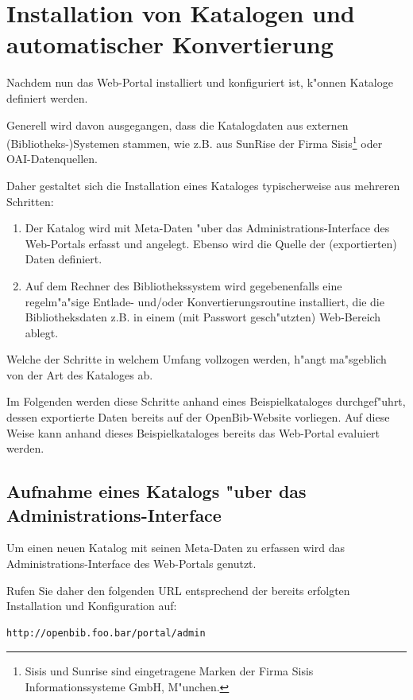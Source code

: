 \documentclass[11pt, twoside, a4paper, BCOR8mm, DIV12, bibtotoc,idxtotoc]{scrbook}
\begin{document}
\chapter{Installation von Katalogen und automatischer Konvertierung}

Nachdem nun das Web-Portal installiert und konfiguriert ist, k"onnen
Kataloge definiert werden.

Generell wird davon ausgegangen, dass die Katalogdaten aus externen
(Bibliotheks-)Systemen stammen, wie z.B. aus SunRise der Firma
Sisis\footnote{Sisis und Sunrise sind eingetragene Marken der Firma
  Sisis Informationssysteme GmbH, M"unchen.} oder OAI-Datenquellen.

Daher gestaltet sich die Installation eines Kataloges typischerweise
aus mehreren Schritten:

\begin{enumerate}
\item Der Katalog wird mit Meta-Daten "uber das
  Administrations-Interface des Web-Portals erfasst und
  angelegt. Ebenso wird die Quelle der (exportierten) Daten definiert.
\item Auf dem Rechner des Bibliothekssystem wird gegebenenfalls eine
  regelm"a"sige Entlade- und/oder Konvertierungsroutine installiert,
  die die Bibliotheksdaten z.B. in einem (mit Passwort gesch"utzten)
  Web-Bereich ablegt.
\end{enumerate}

Welche der Schritte in welchem Umfang vollzogen werden, h"angt
ma"sgeblich von der Art des Kataloges ab.

Im Folgenden werden diese Schritte anhand eines Beispielkataloges
durchgef"uhrt, dessen exportierte Daten bereits auf der
OpenBib-Website vorliegen. Auf diese Weise kann anhand dieses
Beispielkataloges bereits das Web-Portal evaluiert werden.

\section{Aufnahme eines Katalogs "uber das Administrations-Interface}

Um einen neuen Katalog mit seinen Meta-Daten zu erfassen wird das
Administrations-Interface des Web-Portals genutzt.

Rufen Sie daher den folgenden URL entsprechend der bereits erfolgten
Installation und Konfiguration auf:

\begin{verbatim}
http://openbib.foo.bar/portal/admin
\end{verbatim}
\end{document}
